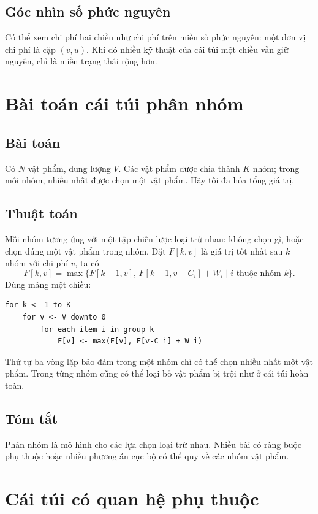 \documentclass[11pt]{article}
\begin{document}
\subsection{Góc nhìn số phức nguyên}

Có thể xem chi phí hai chiều như chi phí trên miền số phức nguyên: một đơn vị
chi phí là cặp \((v,u)\). Khi đó nhiều kỹ thuật của cái túi một chiều vẫn giữ
nguyên, chỉ là miền trạng thái rộng hơn.

\section{Bài toán cái túi phân nhóm}

\subsection{Bài toán}

Có \(N\) vật phẩm, dung lượng \(V\). Các vật phẩm được chia thành \(K\) nhóm;
trong mỗi nhóm, nhiều nhất được chọn một vật phẩm. Hãy tối đa hóa tổng giá trị.

\subsection{Thuật toán}

Mỗi nhóm tương ứng với một tập chiến lược loại trừ nhau: không chọn gì, hoặc
chọn đúng một vật phẩm trong nhóm. Đặt \(F[k,v]\) là giá trị tốt nhất sau
\(k\) nhóm với chi phí \(v\), ta có
\[
  F[k,v]=\max\{F[k-1,v],\,F[k-1,v-C_i]+W_i
    \mid i\text{ thuộc nhóm }k\}.
\]
Dùng mảng một chiều:
\begin{verbatim}
for k <- 1 to K
    for v <- V downto 0
        for each item i in group k
            F[v] <- max(F[v], F[v-C_i] + W_i)
\end{verbatim}

Thứ tự ba vòng lặp bảo đảm trong một nhóm chỉ có thể chọn nhiều nhất một vật
phẩm. Trong từng nhóm cũng có thể loại bỏ vật phẩm bị trội như ở cái túi hoàn
toàn.

\subsection{Tóm tắt}

Phân nhóm là mô hình cho các lựa chọn loại trừ nhau. Nhiều bài có ràng buộc
phụ thuộc hoặc nhiều phương án cục bộ có thể quy về các nhóm vật phẩm.

\section{Cái túi có quan hệ phụ thuộc}
\end{document}
